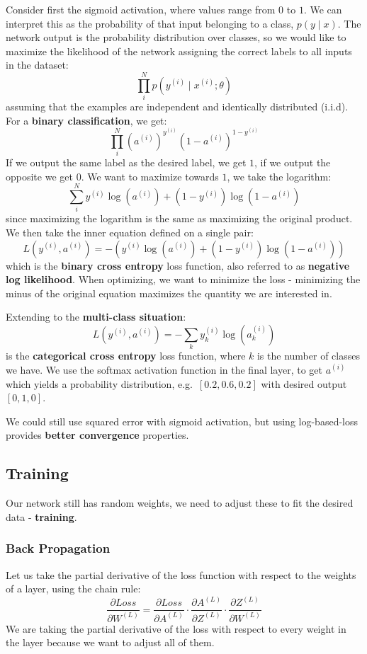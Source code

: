 \documentclass[11pt]{article}
\begin{document}
Consider first the sigmoid activation, where values range from $0$ to $1$.
We can interpret this as the probability of that input belonging to a class, $p(y \mid x)$.
The network output is the probability distribution over classes, so we would like to maximize the likelihood of the network assigning the correct labels to all inputs in the dataset:
\[
  \prod_i^N p(y^{(i)} \mid x^{(i)}; \theta) 
\]
assuming that the examples are independent and identically distributed (i.i.d).
For a \textbf{binary classification}, we get:
\[
  \prod_i^N (a^{(i)})^{y^{(i)}} (1 - a^{(i)})^{1 - y^{(i)}}
\]
If we output the same label as the desired label, we get $1$, if we output the opposite we get $0$.
We want to maximize towards $1$, we take the logarithm:
\[
  \sum_i^N y^{(i)}\log(a^{(i)}) + (1 - y^{(i)}) \log(1 - a^{(i)})
\]
since maximizing the logarithm is the same as maximizing the original product.
We then take the inner equation defined on a single pair:
\[
  L(y^{(i)}, a^{(i)}) = -(y^{(i)}\log(a^{(i)}) + (1 - y^{(i)}) \log(1 - a^{(i)}))
\]
which is the \textbf{binary cross entropy} loss function, also referred to as \textbf{negative log likelihood}.
When optimizing, we want to minimize the loss - minimizing the minus of the original equation maximizes the quantity we are interested in.

Extending to the \textbf{multi-class situation}:
\[
  L(y^{(i)}, a^{(i)}) = -\sum_k y_k^{(i)}\log(a_k^{(i)})
\]
is the \textbf{categorical cross entropy} loss function, where $k$ is the number of classes we have.
We use the softmax activation function in the final layer, to get $a^{(i)}$ which yields a probability distribution, e.g.\ $[0.2, 0.6, 0.2]$ with desired output $[0, 1, 0]$.

We could still use squared error with sigmoid activation, but using log-based-loss provides \textbf{better convergence} properties.

\subsection{Training}
Our network still has random weights, we need to adjust these to fit the desired data - \textbf{training}.

\subsubsection{Back Propagation}
Let us take the partial derivative of the loss function with respect to the weights of a layer, using the chain rule:
\[
  \frac{\partial Loss}{\partial W^{(L)}} = \frac{\partial Loss}{\partial A^{(L)}} \cdot \frac{\partial A^{(L)}}{\partial Z^{(L)}} \cdot \frac{\partial Z^{(L)}}{\partial W^{(L)}}
\]
We are taking the partial derivative of the loss with respect to every weight in the layer because we want to adjust all of them.
\end{document}

